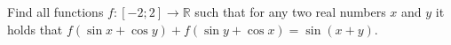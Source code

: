 \problem{}
Find all functions $f \colon [-2; 2] \to \mathbb{R}$ such that for any two real numbers
$x$ and $y$ it holds that
$f(\sin x + \cos y) + f(\sin y + \cos x) = \sin(x + y)$.
\solution
\endproblem
